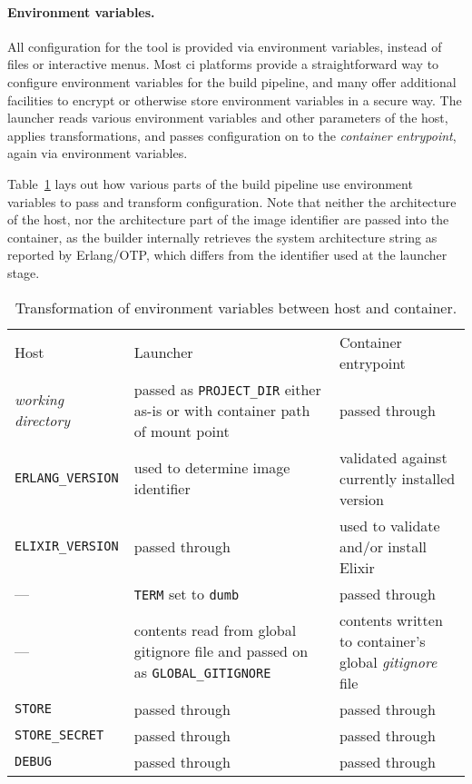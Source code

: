 \paragraph{Environment variables.} All configuration for the tool is provided via environment variables, instead of files or interactive menus. Most \acrlong{ci} platforms provide a straightforward way to configure environment variables for the build pipeline, and many offer additional facilities to encrypt or otherwise store environment variables in a secure way. The launcher reads various environment variables and other parameters of the host, applies transformations, and passes configuration on to the \emph{container entrypoint}, again via environment variables.

Table~\ref{table:envvars} lays out how various parts of the build pipeline use environment variables to pass and transform configuration. Note that neither the architecture of the host, nor the architecture part of the image identifier are passed into the container, as the builder internally retrieves the system architecture string as reported by Erlang/OTP, which differs from the identifier used at the launcher stage.

\begin{table}[h]
  \setlength{\tabcolsep}{10pt}
  \centering
  \begin{tabularx}{\textwidth}{l X X}
    Host & Launcher & Container entrypoint \\
    \hhline{===}
    \emph{working directory} &
      passed as \lstinline|PROJECT_DIR| \newline
      either as-is or with container path of mount point &
      passed through \\
    \hline
    \lstinline|ERLANG_VERSION| &
      used to determine \newline
      image identifier &
      validated against \newline
      currently installed version \\
    \hline
    \lstinline|ELIXIR_VERSION| &
      passed through &
      used to validate and/or \newline
      install Elixir \\
    \hline
    --- &
      \lstinline|TERM| set to \lstinline|dumb| &
      passed through \\
    \hline
    --- &
      contents read from global gitignore
      file and passed on as \lstinline|GLOBAL_GITIGNORE| &
      contents written to \newline
      container's global \newline
      \emph{gitignore} file \\
    \hline
    \lstinline|STORE| & passed through & passed through \\
    \hline
    \lstinline|STORE_SECRET| & passed through & passed through \\
    \hline
    \lstinline|DEBUG| & passed through & passed through \\
  \end{tabularx}
  \caption{Transformation of environment variables between host and container.}
  \label{table:envvars}
\end{table}



